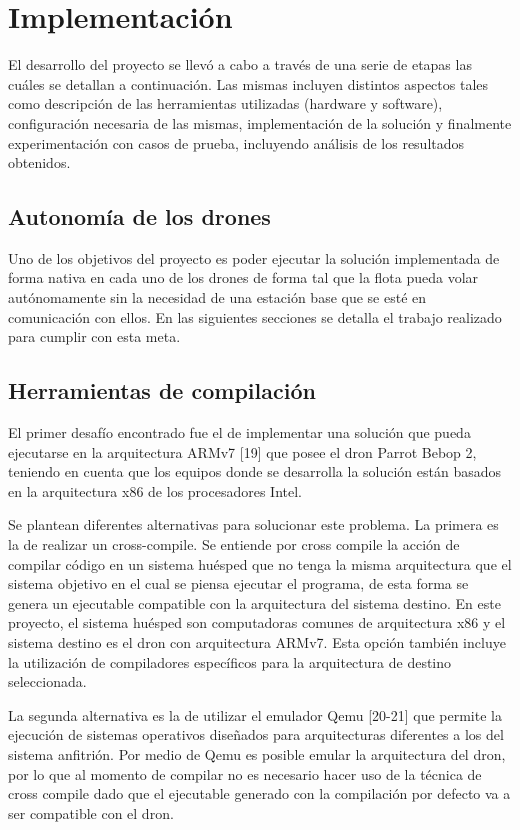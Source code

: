 \chapter{Implementación}
El desarrollo del proyecto se llevó a cabo a través de una serie de etapas las cuáles se detallan a continuación. Las mismas incluyen distintos aspectos tales como descripción de las herramientas utilizadas (hardware y software), configuración necesaria de las mismas, implementación de la solución y finalmente experimentación con casos de prueba, incluyendo análisis de los resultados obtenidos.

\section {Autonomía de los drones}
Uno de los objetivos del proyecto es poder ejecutar la solución implementada de forma nativa en cada uno de los drones de forma tal que la flota pueda volar autónomamente sin la necesidad de una estación base que se esté en comunicación con ellos. En las siguientes secciones se detalla el trabajo realizado para cumplir con esta meta. 
\section {Herramientas de compilación}
El primer desafío encontrado fue el de implementar una solución que pueda ejecutarse en la arquitectura ARMv7 [19] que posee el dron Parrot Bebop 2, teniendo en cuenta que los equipos donde se desarrolla la solución están basados en la arquitectura x86 de los procesadores Intel.

Se plantean diferentes alternativas para solucionar este problema. La primera es la de realizar un cross-compile. Se entiende por cross compile la acción de compilar código en un sistema huésped que no tenga la misma arquitectura que el sistema objetivo en el cual se piensa ejecutar el programa, de esta forma se genera un ejecutable compatible con la arquitectura del sistema destino. En este proyecto, el sistema huésped son computadoras comunes de arquitectura x86 y el sistema destino es el dron con arquitectura ARMv7. Esta opción también incluye la utilización de compiladores específicos para la arquitectura de destino seleccionada. 

La segunda alternativa es la de utilizar el emulador Qemu [20-21] que permite la ejecución de sistemas operativos diseñados para arquitecturas diferentes a los del sistema anfitrión.
Por medio de Qemu es posible emular la arquitectura del dron, por lo que al momento de compilar no es necesario hacer uso de la técnica de cross compile dado que el ejecutable generado con la compilación por defecto va a ser compatible con el dron.

